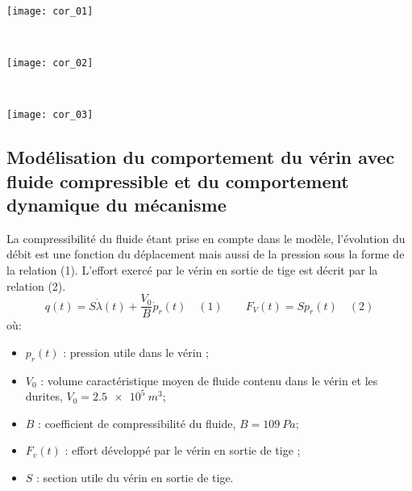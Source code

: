 \ifprof
\begin{corrige} ~\\

\begin{center}
\texttt{[image: cor\_01]}
\end{center}
\end{corrige}
\else
\fi

 \ifprof
\begin{corrige} ~\\

\begin{center}
\texttt{[image: cor\_02]}
\end{center}
\end{corrige}
\else
\fi



\ifprof
\begin{corrige}~\\
\begin{center}
\texttt{[image: cor\_03]}
\end{center}    
\end{corrige}
\else
\fi

\ifprof
\else
\subsection*{Modélisation du comportement du vérin avec fluide compressible et du comportement dynamique du mécanisme}

La compressibilité du fluide étant prise en compte dans le modèle, l'évolution du débit est une fonction du déplacement mais aussi de la pression sous la forme de la relation (1). L'effort exercé par le vérin en sortie de tige est décrit par la relation (2).
$$
q(t)=S\dot{\lambda}(t)+\dfrac{V_0}{B}\dot{p}_r(t) \quad (1) \quad\quad
F_V(t)=Sp_r(t) \quad (2)
$$
où:
\begin{itemize}
\item $p_r(t)$ : pression utile dans le vérin ;
\item $V_0$ : volume caractéristique moyen de fluide contenu dans le vérin et les durites, $V_0 = \SI{2,5e5}{m^3}$;
\item $B$ : coefficient de compressibilité du fluide, $B = \SI{109}{Pa}$;
\item $F_v(t)$ : effort développé par le vérin en sortie de tige ;
\item $S$ : section utile du vérin en sortie de tige.
\end{itemize}

